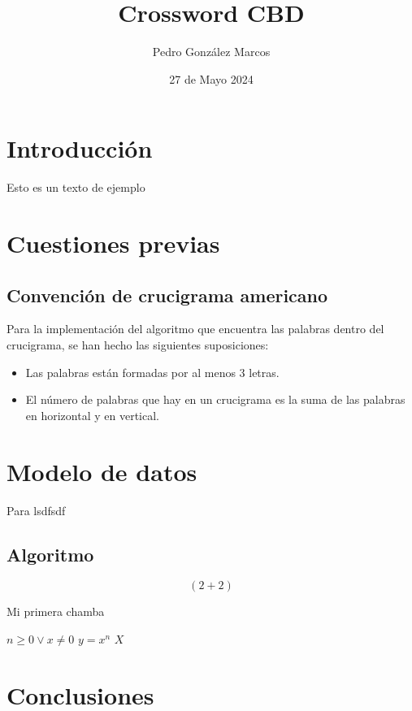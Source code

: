 \documentclass[12pt, a4paper]{article}
\title{Crossword CBD}
\author{Pedro González Marcos}
\date{27 de Mayo 2024}
\begin{document}
\maketitle

\tableofcontents

\section{Introducción}

Esto es un texto de ejemplo \cite{rahman2016feature} \cite{foo}



\section{Cuestiones previas}

\subsection{Convención de crucigrama americano}

Para la implementación del algoritmo que encuentra las palabras dentro del
crucigrama, se han hecho las siguientes suposiciones:

\begin{itemize}
	\item Las palabras están formadas por al menos 3 letras.
	\item El número de palabras que hay en un crucigrama es la suma de
	las palabras en horizontal y en vertical.
\end{itemize}

\section{Modelo de datos}

Para lsdfsdf

\subsection{Algoritmo}



$$
\left( 2+2 \right) 
$$

\begin{algorithm}
\caption{Mi primera chamba}
\begin{algorithmic}
\Require $n \geq 0 \vee x \neq 0$
\Ensure $y = x^n$
	\State $X$
\EndWhile
\end{algorithmic}
\end{algorithm}

\section{Conclusiones}



\end{document}

